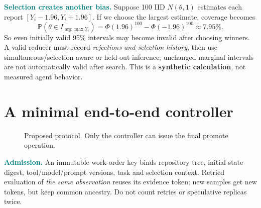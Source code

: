 \documentclass[10pt,twocolumn]{article}
\newcommand{\Claim}[1]{\noindent\textcolor{teal}{\textbf{#1}}\;}
\newcommand{\1}{\mathbf{1}}
\newcommand{\Prb}{\mathbb{P}}
\begin{document}
\Claim{Selection creates another bias.} Suppose 100 IID $N(\theta,1)$ estimates each report $[Y_i-1.96,Y_i+1.96]$. If we choose the largest estimate, coverage becomes
\begin{equation}
\Prb(\theta\in I_{\arg\max Y_i})
=\Phi(1.96)^{100}-\Phi(-1.96)^{100}\approx 7.95\%.
\end{equation}
So even initially valid 95\% intervals may become invalid after choosing winners. A valid reducer must record \emph{rejections and selection history}, then use simultaneous/selection-aware or held-out inference; unchanged marginal intervals are not automatically valid after search. This is a \textbf{synthetic calculation}, not measured agent behavior.

\section{A minimal end-to-end controller}
\begin{figure}[h]
\centering
{}
\caption{Proposed protocol. Only the controller can issue the final promote operation.}
\end{figure}

\Claim{Admission.} An immutable work-order key binds repository tree, initial-state digest, tool/model/prompt versions, task and selection context. Retried evaluation of \emph{the same observation} reuses its evidence token; new samples get new tokens, but keep common ancestry. Do not count retries or speculative replicas twice.
\end{document}

